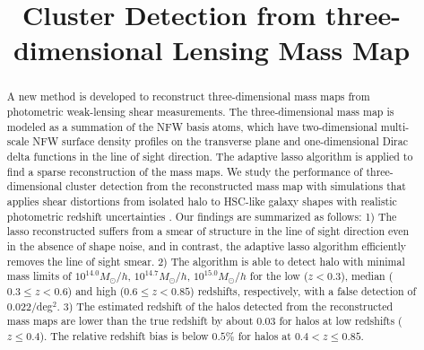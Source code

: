 \documentclass[twocolumn]{aastex63}
\begin{document}
\title{Cluster Detection from three-dimensional Lensing Mass Map}

\begin{abstract}
A new method is developed to reconstruct three-dimensional mass maps from
photometric weak-lensing shear measurements. The three-dimensional mass map is
modeled as a summation of the NFW basis atoms, which have two-dimensional
multi-scale NFW surface density profiles on the transverse plane and
one-dimensional Dirac delta functions in the line of sight direction.  The
adaptive lasso algorithm is applied to find a sparse reconstruction of the mass
maps.
We study the performance of three-dimensional cluster detection from the
reconstructed mass map with simulations that applies shear distortions from
isolated halo to HSC-like galaxy shapes with realistic photometric redshift
uncertainties .
Our findings are summarized as follows:
1) The lasso reconstructed suffers from a smear of structure in the line of
sight direction even in the absence of shape noise, and in contrast, the
adaptive lasso algorithm efficiently removes the line of sight smear.
2) The algorithm is able to detect halo with minimal mass limits of $10^{14.0}
M_{\odot}/h$, $10^{14.7} M_{\odot}/h$, $10^{15.0} M_{\odot}/h$ for the low
($z<0.3$), median ($0.3\leq z< 0.6$) and high ($0.6\leq z< 0.85$) redshifts,
respectively, with a false detection of 0.022/deg$^2$.
3) The estimated redshift of the halos detected from the reconstructed mass
maps are lower than the true redshift by about $0.03$ for halos at low
redshifts ($z\leq 0.4$). The relative redshift bias is below $0.5\%$ for halos
at $0.4<z\leq 0.85$.
\end{abstract}
\end{document}

